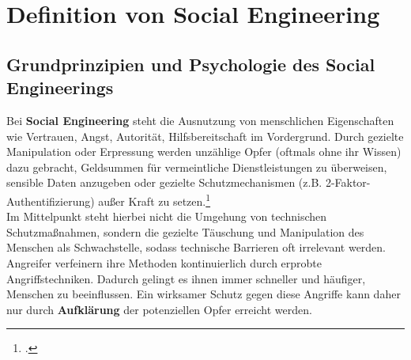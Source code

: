 \documentclass[12pt, a4paper, oneside]{scrartcl}
\begin{document}
\section{Definition von Social Engineering}

\subsection{Grundprinzipien und Psychologie des Social Engineerings}
Bei \textbf{Social Engineering} steht die Ausnutzung von menschlichen Eigenschaften wie 
Vertrauen, Angst, Autorität, Hilfsbereitschaft im Vordergrund. Durch gezielte Manipulation
oder Erpressung werden unzählige Opfer (oftmals ohne ihr Wissen) dazu gebracht, Geldsummen
für vermeintliche Dienstleistungen zu überweisen, sensible Daten anzugeben oder gezielte Schutzmechanismen
(z.B. 2-Faktor-Authentifizierung) außer Kraft zu setzen.\footcite{BSISocialEngineering}\\
Im Mittelpunkt steht hierbei nicht die Umgehung von technischen Schutzmaßnahmen, sondern die gezielte
Täuschung und Manipulation des Menschen als Schwachstelle, sodass technische Barrieren 
oft irrelevant werden. Angreifer verfeinern ihre Methoden kontinuierlich durch erprobte Angriffstechniken. 
Dadurch gelingt es ihnen immer schneller und häufiger, Menschen zu beeinflussen.
Ein wirksamer Schutz gegen diese Angriffe kann daher nur durch \textbf{Aufklärung} der 
potenziellen Opfer erreicht werden.
\end{document}
